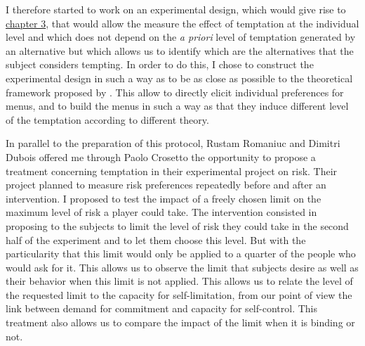\documentclass[
]{book}
\begin{document}
I therefore started to work on an experimental design, which would give rise to
\protect\hyperlink{tempting-lab}{chapter 3},
that would allow the measure the effect of temptation at the
individual level and which does not depend on the \emph{a priori} level of temptation generated by an
alternative but which allows us to identify which are the alternatives that the
subject considers tempting.
In order to do this, I chose to construct the experimental design in such a way
as to be as close as possible to the theoretical framework proposed by
\citet{gul2001temptation}.
This allow to directly elicit individual preferences for menus, and to build the
menus in such a way as that they induce different level of the temptation
according to different theory.

In parallel to the preparation of this protocol, Rustam Romaniuc and Dimitri
Dubois offered me through Paolo Crosetto the opportunity to propose a treatment
concerning temptation in their experimental project on risk.
Their project planned to measure risk preferences repeatedly before and after an
intervention.
I proposed to test the impact of a freely chosen limit on the maximum level of
risk a player could take.
The intervention consisted in proposing to the subjects to limit the level of
risk they could take in the second half of the experiment and to let them choose
this level.
But with the particularity that this limit would only be applied to a quarter of
the people who would ask for it.
This allows us to observe the limit that subjects desire as well as their
behavior when this limit is not applied.
This allows us to relate the level of the requested limit to the capacity for
self-limitation, from our point of view the link between demand for commitment
and capacity for self-control.
This treatment also allows us to compare the impact of the limit when it is
binding or not.
\end{document}
